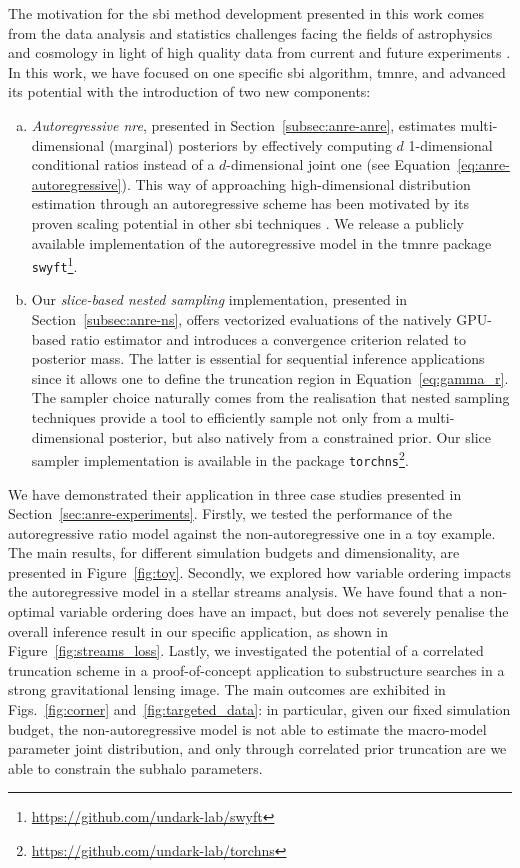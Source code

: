  The motivation for the \gls*{sbi} method development presented in this work comes from the data analysis and statistics challenges facing the fields of astrophysics and cosmology in light of high quality data from current and future experiments \cite{EUCLID:2011zbd, Gardner:2006ky,LSSTDarkEnergyScience:2012kar, Neichel:2018aa, Prusti:2016aa, Lazio:2009aa, Knodlseder:2020onx}. In this work, we have focused on one specific \gls*{sbi} algorithm, \gls*{tmnre}, and advanced its potential with the introduction of two new components:
\begin{enumerate}[a)]
    \item \emph{Autoregressive \gls*{nre}}, presented in Section~\ref{subsec:anre-anre}, estimates multi-dimensional (marginal) posteriors by effectively computing $d$ 1-dimensional conditional ratios instead of a $d$-dimensional joint one (see Equation~\eqref{eq:anre-autoregressive}). This way of approaching high-dimensional distribution estimation through an autoregressive scheme has been motivated by its proven scaling potential in other \gls*{sbi} techniques \cite{Germain:2015yft, Uria:2016aa, Papamakarios:2017tec}. We release a publicly available implementation of the autoregressive model in the \gls*{tmnre} package \texttt{swyft}\footnote{\url{https://github.com/undark-lab/swyft}}.
    \item Our \emph{slice-based nested sampling} implementation, presented in Section~\ref{subsec:anre-ns}, offers vectorized evaluations of the natively GPU-based ratio estimator and introduces a convergence criterion related to posterior mass. The latter is essential for sequential inference applications since it allows one to define the truncation region in Equation~\eqref{eq:gamma_r}. The sampler choice naturally comes from the realisation that nested sampling techniques provide a tool to efficiently sample not only from a multi-dimensional posterior, but also natively from a constrained prior. Our slice sampler implementation is available in the package \texttt{torchns}\footnote{\url{https://github.com/undark-lab/torchns}}.
\end{enumerate}
We have demonstrated their application in three case studies presented in Section~\ref{sec:anre-experiments}. Firstly, we tested the performance of the autoregressive ratio model against the non-autoregressive one in a toy example. The main results, for different simulation budgets and dimensionality, are presented in Figure~\ref{fig:toy}. Secondly, we explored how variable ordering impacts the autoregressive model in a stellar streams analysis. We have found that a non-optimal variable ordering does have an impact, but does not severely penalise the overall inference result in our specific application, as shown in Figure~\ref{fig:streams_loss}. Lastly, we investigated the potential of a correlated truncation scheme in a proof-of-concept application to substructure searches in a strong gravitational lensing image. The main outcomes are exhibited in Figs.~\ref{fig:corner} and~\ref{fig:targeted_data}: in particular, given our fixed simulation budget, the non-autoregressive model is not able to estimate the macro-model parameter joint distribution, and only through correlated prior truncation are we able to constrain the subhalo parameters.

